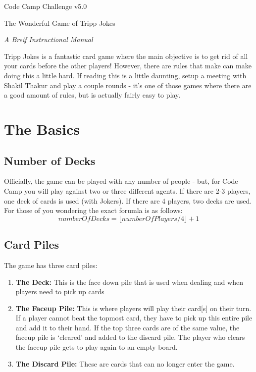 \documentclass{article}
\begin{document}
\centerline{\sc \large Code Camp Challenge v5.0}
\vspace{.5pc}
\centerline{\sc The Wonderful Game of Tripp Jokes}
\centerline{\it A Breif Instructional Manual}
\vspace{2pc}

Tripp Jokes is a fantastic card game where the main objective is to get rid of all your cards before the other players! However, there are rules that make can make doing this a little hard. If reading this is a little daunting, setup a meeting with Shakil Thakur and play a couple rounds - it's one of those games where there are a good amount of rules, but is actually fairly easy to play.

\section*{The Basics}
\subsection*{Number of Decks}
Officially, the game can be played with any number of people - but, for Code Camp you will play against two or three different agents. If there are 2-3 players, one deck of cards is used (with Jokers). If there are 4 players, two decks are used. For those of you wondering the exact forumla is as follows:
\begin{equation}
	numberOfDecks = \lfloor numberOfPlayers / 4 \rfloor + 1
\end{equation}
\subsection*{Card Piles}
The game has three card piles:
\begin{enumerate}
	\item \textbf{The Deck:} This is the face down pile that is used when dealing and when players need to pick up cards
	\item \textbf{The Faceup Pile:} This is where players will play their card[s] on their turn. If a player cannot beat the topmost card, they have to pick up this entire pile and add it to their hand. If the top three cards are of the same value, the faceup pile is `cleared' and added to the discard pile. The player who clears the faceup pile gets to play again to an empty board.
	\item \textbf{The Discard Pile:} These are cards that can no longer enter the game.
\end{enumerate}
\end{document}
